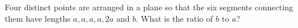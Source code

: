Four distinct points are arranged in a plane so that the six segments connecting them have lengths $a,a,a,a,2a$ and $b$. What is the ratio of $b$ to $a$?
